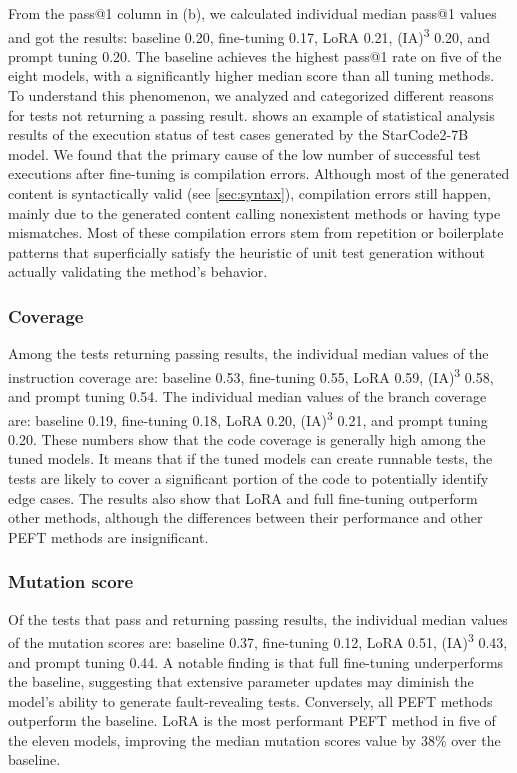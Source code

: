 \documentclass[12pt]{book}
\begin{document}
From the pass@1 column in (b), we calculated individual median pass@1 values and got the results: baseline 0.20, fine-tuning 0.17, LoRA 0.21, (IA)\textsuperscript{3} 0.20, and prompt tuning 0.20. The baseline achieves the highest pass@1 rate on five of the eight models, with a significantly higher median score than all tuning methods. To understand this phenomenon, we analyzed and categorized different reasons for tests not returning a passing result.  shows an example of statistical analysis results of the execution status of test cases generated by the StarCode2-7B model. We found that the primary cause of the low number of successful test executions after fine-tuning is compilation errors. Although most of the generated content is syntactically valid (see \cref{sec:syntax}), compilation errors still happen, mainly due to the generated content calling nonexistent methods or having type mismatches. Most of these compilation errors stem from repetition or boilerplate patterns that superficially satisfy the heuristic of unit test generation without actually validating the method’s behavior.

\subsubsection{Coverage}
Among the tests returning passing results, the individual median values of the instruction coverage are: baseline 0.53, fine-tuning 0.55, LoRA 0.59, (IA)\textsuperscript{3} 0.58, and prompt tuning 0.54. The individual median values of the branch coverage are: baseline 0.19, fine-tuning 0.18, LoRA 0.20, (IA)\textsuperscript{3} 0.21, and prompt tuning 0.20. These numbers show that the code coverage is generally high among the tuned models. It means that if the tuned models can create runnable tests, the tests are likely to cover a significant portion of the code to potentially identify edge cases. 
The results also show that LoRA and full fine-tuning outperform other methods, although the differences between their performance and other PEFT methods are insignificant. 

\subsubsection{Mutation score}
\label{sec:mutation-score}
Of the tests that pass and returning passing results, the individual median values of the mutation scores are: baseline 0.37, fine-tuning 0.12, LoRA 0.51, (IA)\textsuperscript{3} 0.43, and prompt tuning 0.44. A notable finding is that full fine-tuning underperforms the baseline, suggesting that extensive parameter updates may diminish the model’s ability to generate fault-revealing tests. Conversely, all PEFT methods outperform the baseline. LoRA is the most performant PEFT method in five of the eleven models, improving the median mutation scores value by 38\% over the baseline.
\end{document}
